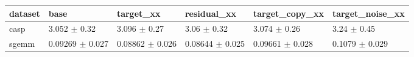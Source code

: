 \begin{tabular}{llllll}
\toprule
dataset & base & target\_xx & residual\_xx & target\_copy\_xx & target\_noise\_xx \\
\midrule
casp & 3.052 $\pm$ 0.32 & 3.096 $\pm$ 0.27 & 3.06 $\pm$ 0.32 & 3.074 $\pm$ 0.26 & 3.24 $\pm$ 0.45 \\
sgemm & 0.09269 $\pm$ 0.027 & 0.08862 $\pm$ 0.026 & 0.08644 $\pm$ 0.025 & 0.09661 $\pm$ 0.028 & 0.1079 $\pm$ 0.029 \\
\bottomrule
\end{tabular}
